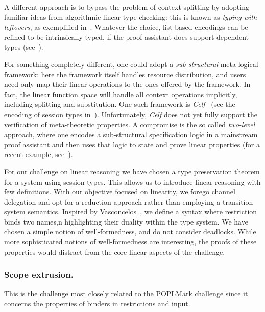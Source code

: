 \documentclass[runningheads]{llncs}
\begin{document}
A different approach is to bypass the problem of context splitting by adopting familiar ideas from algorithmic linear type checking: this is known as \emph{typing with leftovers}, as exemplified in~\cite{DBLP:conf/forte/ZalakainD21}.
Whatever the choice, list-based encodings can be refined to be intrinsically-typed, if the proof assistant does support dependent types (see~\cite{Thiemann2019,CicconeP20,RouvoetPKV20}).

For something completely different, one could adopt a \emph{sub-structural} meta-logical framework: here the framework itself handles resource distribution, and users need only map their linear operations to the ones offered by the framework.
In fact, the linear function space will handle all context operations implicitly, including splitting and substitution.
One such framework is \emph{Celf}~\cite{Schack-Nielsen:IJCAR08} (see the encoding of session types in~\cite{Bock2016}).
Unfortunately, \emph{Celf} does not yet fully support the verification of meta-theoretic properties.
A compromise is the so called \emph{two-level} approach, where one encodes a sub-structural specification logic in a mainstream proof assistant and then uses that logic to state and prove linear properties (for a recent example, see~\cite{Felty:MSCS21}).


For our challenge on linear reasoning we have chosen a type preservation theorem
for a system using session types.
This allows us to introduce linear reasoning with few definitions.
With our objective focused on linearity, we forego channel delegation
and opt for a reduction approach rather than employing a transition
system semantics.  Inspired by Vasconcelos~\cite{Vasconcelos2012}, we
define a syntax where restriction binds two names,n highlighting
their duality within the type system.  We have chosen a simple notion
of well-formedness, and do not  consider
deadlocks. While more sophisticated notions of well-formedness are
interesting, the proofs of these properties would distract from the
core linear aspects of the challenge.

\subsubsection{Scope extrusion.}
This is the challenge most closely related to the POPLMark challenge
since it concerns the properties of binders in restrictions and input.
\end{document}
